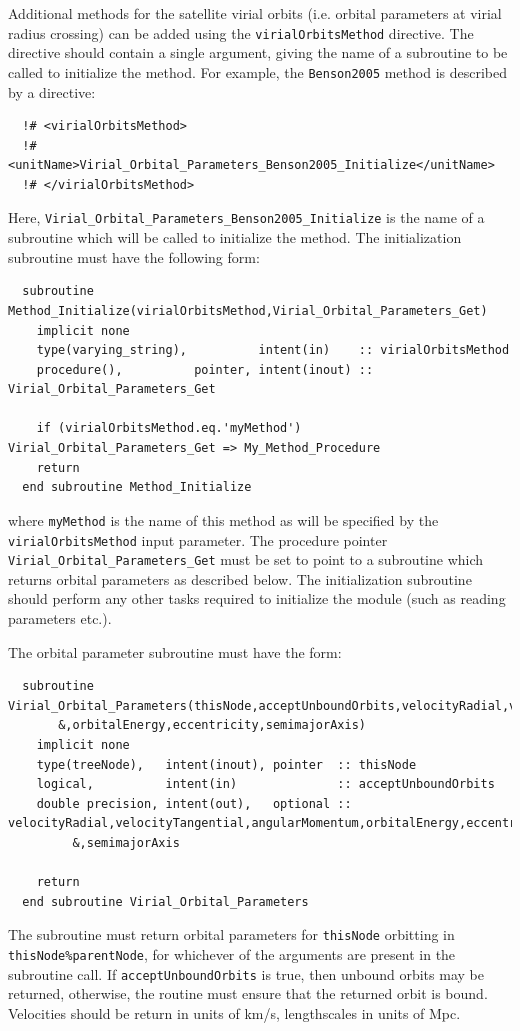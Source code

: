 Additional methods for the satellite virial orbits (i.e. orbital parameters at virial radius crossing) can be added using the {\tt virialOrbitsMethod} directive. The directive should contain a single argument, giving the name of a subroutine to be called to initialize the method. For example, the {\tt Benson2005} method is described by a directive:
\begin{verbatim}
  !# <virialOrbitsMethod>
  !#  <unitName>Virial_Orbital_Parameters_Benson2005_Initialize</unitName>
  !# </virialOrbitsMethod>
\end{verbatim}
Here, {\tt Virial\_Orbital\_Parameters\_Benson2005\_Initialize} is the name of a subroutine which will be called to initialize the method. The initialization subroutine must have the following form:
\begin{verbatim}
  subroutine Method_Initialize(virialOrbitsMethod,Virial_Orbital_Parameters_Get)
    implicit none
    type(varying_string),          intent(in)    :: virialOrbitsMethod
    procedure(),          pointer, intent(inout) :: Virial_Orbital_Parameters_Get
    
    if (virialOrbitsMethod.eq.'myMethod') Virial_Orbital_Parameters_Get => My_Method_Procedure
    return
  end subroutine Method_Initialize
\end{verbatim}
where {\tt myMethod} is the name of this method as will be specified by the {\tt virialOrbitsMethod} input parameter. The procedure pointer {\tt Virial\_Orbital\_Parameters\_Get} must be set to point to a subroutine which returns orbital parameters as described below. The initialization subroutine should perform any other tasks required to initialize the module (such as reading parameters etc.).

The orbital parameter subroutine must have the form:
\begin{verbatim}
  subroutine Virial_Orbital_Parameters(thisNode,acceptUnboundOrbits,velocityRadial,velocityTangential,angularMomentum&
       &,orbitalEnergy,eccentricity,semimajorAxis)
    implicit none
    type(treeNode),   intent(inout), pointer  :: thisNode
    logical,          intent(in)              :: acceptUnboundOrbits
    double precision, intent(out),   optional :: velocityRadial,velocityTangential,angularMomentum,orbitalEnergy,eccentricity&
         &,semimajorAxis

    return
  end subroutine Virial_Orbital_Parameters
\end{verbatim}
The subroutine must return orbital parameters for {\tt thisNode} orbitting in {\tt thisNode\%parentNode}, for whichever of the arguments are present in the subroutine call. If {\tt acceptUnboundOrbits} is true, then unbound orbits may be returned, otherwise, the routine must ensure that the returned orbit is bound. Velocities should be return in units of km/s, lengthscales in units of Mpc.

